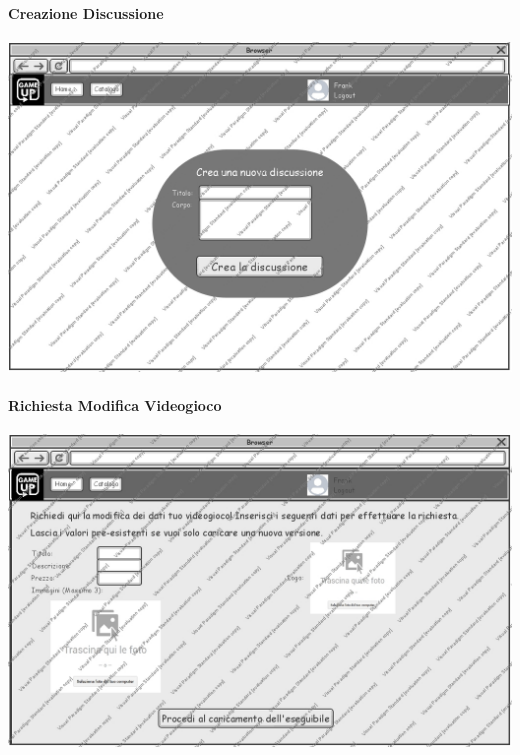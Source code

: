 \paragraph{Creazione Discussione}
\begin{center}
\includegraphics[width=\textwidth,height=\textheight,keepaspectratio]{Figure/Mockups/CreazioneDiscussione.jpg}
\end{center}

\newpage
\paragraph{Richiesta Modifica Videogioco}
\begin{center}
\includegraphics[width=\textwidth,height=\textheight,keepaspectratio]{Figure/Mockups/RichiestaModificaVideogioco.jpg}
\end{center}

\newpage
